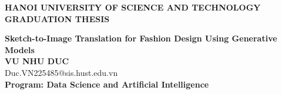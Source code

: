 \documentclass[DoAn.tex]{subfiles}
\begin{document}
\begin{titlepage}
\thispagestyle{empty}
\begin{center}

{\textbf{\large{HANOI UNIVERSITY OF SCIENCE AND TECHNOLOGY}}}\\[4cm]

{\textbf{\huge{GRADUATION THESIS}}}\\[1cm]
{\textbf{\Large{Sketch-to-Image Translation for Fashion Design Using Generative Models}}\\[1cm]

{\textbf{\large{VU NHU DUC}}}\\
{\large{Duc.VN225485@sis.hust.edu.vn}}\\[0.5cm]

{\textbf{\large{Program: Data Science and Artificial Intelligence}}}\\

\vspace{4cm}
\begin{table}[H]
\centering
{}
\end{table}}
\end{center}



\end{titlepage}
\end{document}
